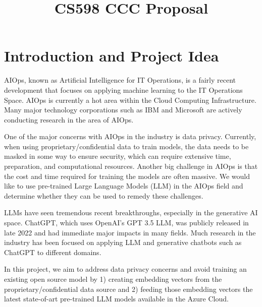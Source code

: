 \documentclass[conference]{IEEEtran}
\begin{document}
\title{CS598 CCC Proposal\\
}

\author{
\and
{}
\and
{}
}
\maketitle


\section{Introduction and Project Idea}

AIOps, known as Artificial Intelligence for IT Operations, is a fairly recent development that focuses on applying machine learning to the IT Operations Space. AIOps is currently a hot area within the Cloud Computing Infrastructure. Many major technology corporations such as IBM and Microsoft \cite{li2022an}  are actively conducting research in the area of AIOps. \cite{aiops-challenges} 

One of the major concerns with AIOps in the industry is data privacy. Currently, when using proprietary/confidential data to train models, the data needs to be masked in some way to ensure security, which can require extensive time, preparation, and computational resources. Another big challenge in AIOps is that the cost and time required for training the models are often massive. We would like to use pre-trained Large Language Models (LLM) in the AIOps field and determine whether they can be used to remedy these challenges.

LLMs have seen tremendous recent breakthroughs, especially in the generative AI space. ChatGPT, which uses OpenAI's GPT 3.5 LLM, was publicly released in late 2022 and had immediate major impacts in many fields. Much research in the industry has been focused on applying LLM and generative chatbots such as ChatGPT to different domains. 

In this project, we aim to address data privacy concerns and avoid training an existing open source model \cite{network-log-anomaly-detection}  by 1) creating embedding vectors from the proprietary/confidential data source and 2) feeding those embedding vectors the latest state-of-art pre-trained LLM models available in the Azure Cloud.
\end{document}
